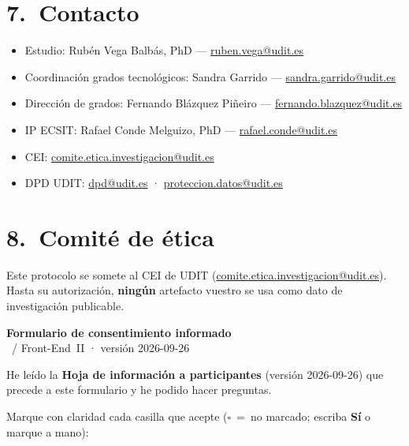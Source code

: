 \documentclass[11pt,a4paper]{scrartcl}
\begin{document}
\section*{7.\ Contacto}

\begin{itemize}
  \item Estudio: Rubén Vega Balbás, PhD ---
        \href{mailto:ruben.vega@udit.es}{ruben.vega@udit.es}
  \item Coordinación grados tecnológicos: Sandra Garrido ---
        \href{mailto:sandra.garrido@udit.es}{sandra.garrido@udit.es}
  \item Dirección de grados: Fernando Blázquez Piñeiro ---
        \href{mailto:fernando.blazquez@udit.es}{fernando.blazquez@udit.es}
  \item IP ECSIT: Rafael Conde Melguizo, PhD ---
        \href{mailto:rafael.conde@udit.es}{rafael.conde@udit.es}
  \item CEI:
        \href{mailto:comite.etica.investigacion@udit.es}{comite.etica.investigacion@udit.es}
  \item DPD UDIT:
        \href{mailto:dpd@udit.es}{dpd@udit.es} ·
        \href{mailto:proteccion.datos@udit.es}{proteccion.datos@udit.es}
\end{itemize}

\section*{8.\ Comité de ética}

Este protocolo se somete al CEI de UDIT
(\href{mailto:comite.etica.investigacion@udit.es}{comite.etica.investigacion@udit.es}).
Hasta su autorización, \textbf{ningún} artefacto vuestro se usa
como dato de investigación publicable.

\newpage
\LogoRow

\begin{center}
  {\Large\sffamily\bfseries Formulario de consentimiento informado}\\[0.35em]
  {\normalsize\sffamily \TTODfull\ / Front-End~II · versión 2026-09-26}
\end{center}

\vspace{0.4em}
\noindent
He leído la \textbf{Hoja de información a participantes} (versión 2026-09-26)
que precede a este formulario y he podido hacer preguntas.

\vspace{0.5em}
\noindent
Marque con claridad cada casilla que acepte
(\texttt{$\square$}~=~no marcado; escriba \textbf{Sí} o marque a mano):
\end{document}
